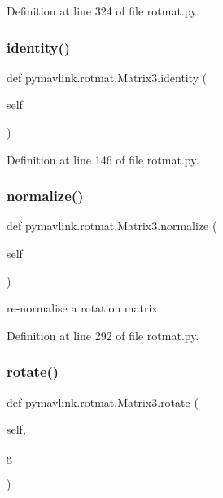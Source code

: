 Definition at line 324 of file rotmat.\+py.

\mbox{\label{classpymavlink_1_1rotmat_1_1Matrix3_a3ec58a383c67373271ee5df401123516}} 
\subsubsection{\texorpdfstring{identity()}{identity()}}
{\footnotesize\ttfamily def pymavlink.\+rotmat.\+Matrix3.\+identity (\begin{DoxyParamCaption}\item[{}]{self }\end{DoxyParamCaption})}



Definition at line 146 of file rotmat.\+py.

\mbox{\label{classpymavlink_1_1rotmat_1_1Matrix3_a8dcef0074eff59c72566574f380a8487}} 
\subsubsection{\texorpdfstring{normalize()}{normalize()}}
{\footnotesize\ttfamily def pymavlink.\+rotmat.\+Matrix3.\+normalize (\begin{DoxyParamCaption}\item[{}]{self }\end{DoxyParamCaption})}

\begin{DoxyVerb}re-normalise a rotation matrix\end{DoxyVerb}
 

Definition at line 292 of file rotmat.\+py.

\mbox{\label{classpymavlink_1_1rotmat_1_1Matrix3_a68eaac6b40df4fda8589403cfb1c6f47}} 
\subsubsection{\texorpdfstring{rotate()}{rotate()}}
{\footnotesize\ttfamily def pymavlink.\+rotmat.\+Matrix3.\+rotate (\begin{DoxyParamCaption}\item[{}]{self,  }\item[{}]{g }\end{DoxyParamCaption})}

